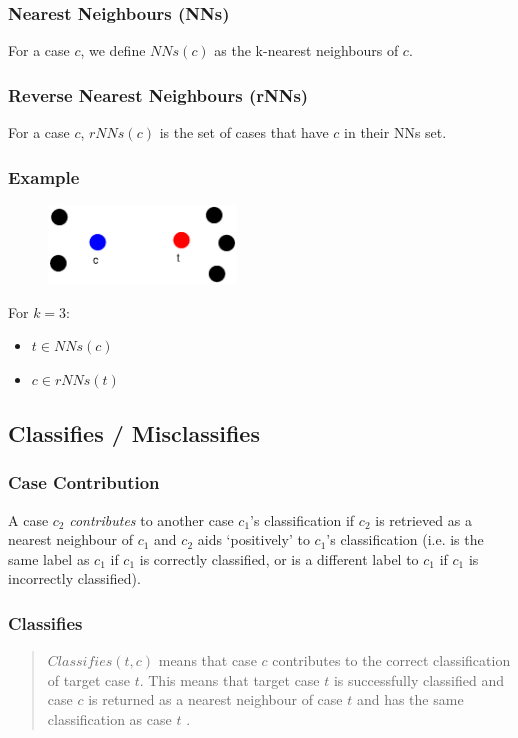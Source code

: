 \documentclass[a4paper,11pt]{report}
\begin{document}
\subsubsection{Nearest Neighbours (NNs)}
For a case $c$, we define $NNs(c)$ as the k-nearest neighbours of $c$.

\subsubsection{Reverse Nearest Neighbours (rNNs)}
For a case $c$, $rNNs(c)$ is the set of cases that have $c$ in their NNs set.
\vspace{1em}
\begin{samepage}
\subsubsection{Example}
\begin{figure}[h!] \centering
\includegraphics[width=5cm]{./Drawn/RcdlNnRnnEg}
\end{figure}
For $k=3$:
\begin{itemize}
	\item $ t \in NNs(c) $
	\item $ c \in rNNs(t) $
\end{itemize}
\end{samepage}

\subsection{Classifies / Misclassifies}
\subsubsection{Case Contribution\label{sec:contributes}}
A case $c_{2}$ \emph{contributes} to another case $c_{1}$'s classification if $c_{2}$ is retrieved as a nearest neighbour of $c_{1}$ and $c_{2}$ aids `positively' to $c_{1}$'s classification (i.e. is the same label as $c_{1}$ if $c_{1}$ is correctly classified, or is a different label to $c_{1}$ if  $c_{1}$ is incorrectly classified).
\subsubsection{Classifies}
\begin{quote}
$ Classifies(t, c) $ means that case $c$ contributes to the correct classification of target case $t$. This means that target case $t$ is successfully classified and case $c$ is returned as a nearest neighbour of case $t$ and has the same classification as case $t$ \citep{Delany2009}.
\end{quote}
\end{document}
